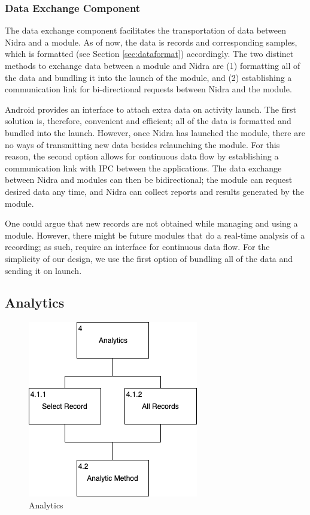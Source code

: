 \subsubsection{Data Exchange Component}\label{des:des}

The data exchange component facilitates the transportation of data between Nidra and a module. As of now, the data is records and corresponding samples, which is formatted (see Section \ref{sec:dataformat}) accordingly. The two distinct methods to exchange data between a module and Nidra are (1) formatting all of the data and bundling it into the launch of the module, and (2) establishing a communication link for bi-directional requests between Nidra and the module. 

Android provides an interface to attach extra data on activity launch. The first solution is, therefore, convenient and efficient; all of the data is formatted and bundled into the launch. However, once Nidra has launched the module, there are no ways of transmitting new data besides relaunching the module. For this reason, the second option allows for continuous data flow by establishing a communication link with IPC between the applications. The data exchange between Nidra and modules can then be bidirectional; the module can request desired data any time, and Nidra can collect reports and results generated by the module. 

One could argue that new records are not obtained while managing and using a module. However, there might be future modules that do a real-time analysis of a recording; as such, require an interface for continuous data flow. For the simplicity of our design, we use the first option of bundling all of the data and sending it on launch.

\subsection{Analytics}\label{soc:analytics}

\begin{figure}
    \centering
    \includegraphics[scale=0.6]{images/Analytics.png}
    \caption{Analytics}
    \label{fig:hta_analytics}
\end{figure}

